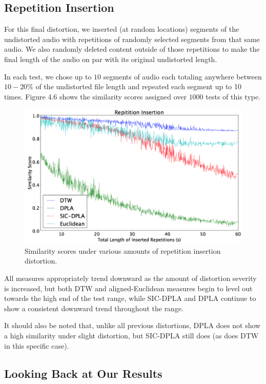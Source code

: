 \documentclass[a4paper,12pt]{report} 	%
\numberwithin{figure}{chapter}
\numberwithin{table}{chapter}
\numberwithin{equation}{chapter}
\begin{document}
\begin{flushleft}
\subsection{Repetition Insertion}
For this final distortion, we inserted (at random locations) segments of the undistorted audio with repetitions of randomly selected segments from that same audio. We also randomly deleted content outside of those repetitions to make the final length of the audio on par with its original undistorted length.

In each test, we chose up to $10$ segments of audio each totaling anywhere between $10-20\%$ of the undistorted file length and repeated each segment up to 10 times. Figure 4.6 shows the similarity scores assigned over $1000$ tests of this type.
\begin{figure}[h!]
\begin{center}
\includegraphics[scale=0.5,width=\linewidth]{RepetitionInsertion}
\caption[Repetition Insertion Results]{Similarity scores under various amounts of repetition insertion distortion.}
\end{center}
\end{figure}

All measures appropriately trend downward as the amount of distortion severity is increased, but both DTW and aligned-Euclidean measures begin to level out towards the high end of the test range, while SIC-DPLA and DPLA continue to show a consistent downward trend throughout the range. 

It should also be noted that, unlike all previous distortions, DPLA does not show a high similarity under slight distortion, but SIC-DPLA still does (as does DTW in this specific case).

\subsection{Looking Back at Our Results}


\end{flushleft}
\end{document}
